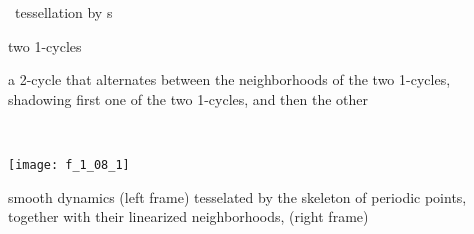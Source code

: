 \begin{frame}{\statesp\ tessellation by \po s}
    \begin{minipage}[b]{0.40\textwidth}
\begin{block}{}
two 1-cycles

\medskip

a 2-cycle that alternates
between the neighborhoods of the two 1-cycles,
shadowing first one of the
two 1-cycles, and then the other
\end{block}
    \end{minipage}
~~~~~~
    \begin{minipage}[b]{0.51\textwidth}
\begin{center}
\texttt{[image: f\_1\_08\_1]}
\end{center}
    \end{minipage}
smooth dynamics  (left frame) tesselated by the skeleton of periodic
points, together with their linearized neighborhoods, (right frame)
\end{frame}



